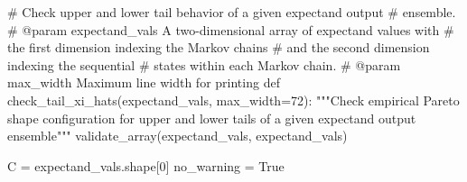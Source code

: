 \documentclass[
  letterpaper,
  DIV=11,
  numbers=noendperiod]{scrartcl}
\newenvironment{Shaded}{\begin{snugshade}}{\end{snugshade}}
\newcommand{\CommentTok}[1]{\textcolor[rgb]{0.37,0.37,0.37}{#1}}
\newcommand{\DecValTok}[1]{\textcolor[rgb]{0.68,0.00,0.00}{#1}}
\newcommand{\KeywordTok}[1]{\textcolor[rgb]{0.00,0.23,0.31}{#1}}
\newcommand{\NormalTok}[1]{\textcolor[rgb]{0.00,0.23,0.31}{#1}}
\newcommand{\OperatorTok}[1]{\textcolor[rgb]{0.37,0.37,0.37}{#1}}
\newcommand{\StringTok}[1]{\textcolor[rgb]{0.13,0.47,0.30}{#1}}
\newcommand{\VariableTok}[1]{\textcolor[rgb]{0.07,0.07,0.07}{#1}}
\begin{document}
\begin{Shaded}
\begin{Highlighting}[]
\CommentTok{\# Check upper and lower tail behavior of a given expectand output}
\CommentTok{\# ensemble.}
\CommentTok{\# @param expectand\_vals A two{-}dimensional array of expectand values with}
\CommentTok{\#                       the first dimension indexing the Markov chains}
\CommentTok{\#                       and the second dimension indexing the sequential}
\CommentTok{\#                       states within each Markov chain.}
\CommentTok{\# @param max\_width Maximum line width for printing}
\KeywordTok{def}\NormalTok{ check\_tail\_xi\_hats(expectand\_vals, max\_width}\OperatorTok{=}\DecValTok{72}\NormalTok{):}
  \CommentTok{"""Check empirical Pareto shape configuration for upper and lower}
\CommentTok{     tails of a given expectand output ensemble"""}
\NormalTok{  validate\_array(expectand\_vals, }\StringTok{\textquotesingle{}expectand\_vals\textquotesingle{}}\NormalTok{)}

\NormalTok{  C }\OperatorTok{=}\NormalTok{ expectand\_vals.shape[}\DecValTok{0}\NormalTok{]}
\NormalTok{  no\_warning }\OperatorTok{=} \VariableTok{True}


\end{Highlighting}
\end{Shaded}
\end{document}
